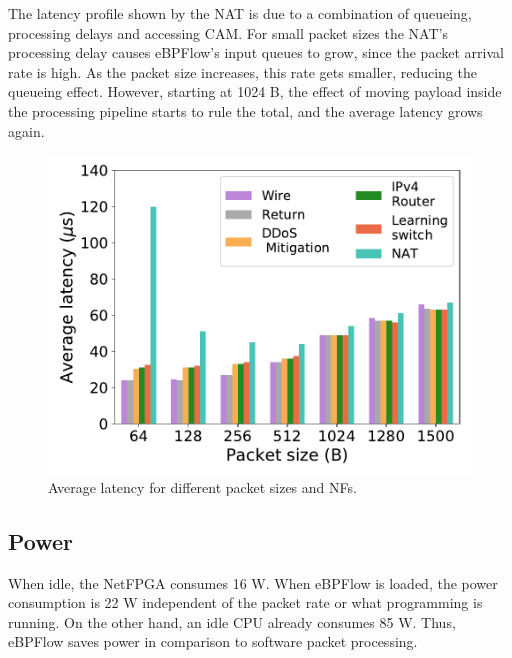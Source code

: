 The latency profile shown by the NAT is due to a combination of queueing, processing delays and accessing CAM. For small packet sizes the NAT's processing delay causes eBPFlow's input queues to grow, since the packet arrival rate is high. As the packet size increases, this rate gets smaller, reducing the queueing effect. However, starting at 1024 B, the effect of moving payload inside the processing pipeline starts to rule the total, and the average latency grows again.

\begin{figure}[th]
\centering
\includegraphics[width=\columnwidth]{figures/latency.pdf}
\caption{Average latency for different packet sizes and NFs.}
\label{fig:latency}
\end{figure}

\subsection{Power}
\label{sec:power}


When idle, the NetFPGA consumes 16 W.
When eBPFlow is loaded, the power consumption is 22 W independent of the packet rate or what programming is running.
On the other hand, an idle CPU already consumes 85 W.
Thus, eBPFlow saves power in comparison to software packet processing.


